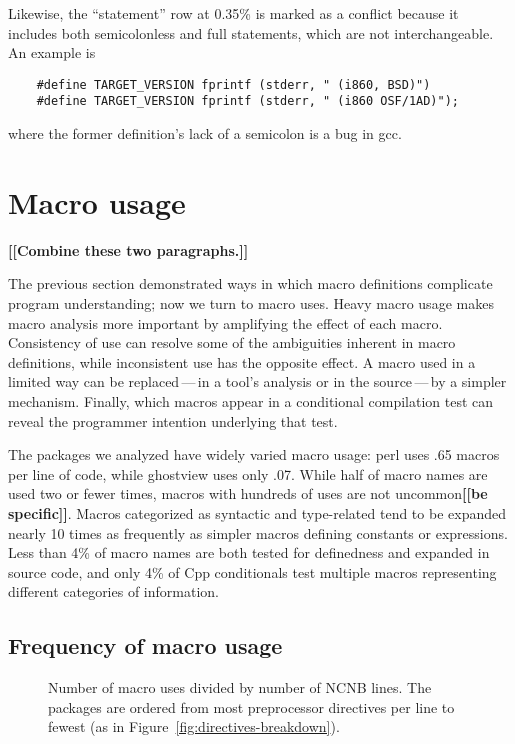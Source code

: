 \documentclass[10pt]{article}
\newcommand{\comment}[1]{\textbf{[[#1]]}}
\newcommand{\pkg}[1]{\textsf{#1}}
\newcommand{\captionsmall}[1]{\caption[]{\small #1}}
\begin{document}
Likewise, the ``statement'' row at 0.35\% is marked as a conflict because
it includes both semicolonless and full statements, which are not
interchangeable.  An example is
\begin{verbatim}
    #define TARGET_VERSION fprintf (stderr, " (i860, BSD)")
    #define TARGET_VERSION fprintf (stderr, " (i860 OSF/1AD)");
\end{verbatim}
where the former definition's lack of a semicolon is a bug in \pkg{gcc}.



\section{Macro usage}

\comment{Combine these two paragraphs.}

The previous section demonstrated ways in which macro definitions
complicate program understanding; now we turn to macro uses.  Heavy macro
usage makes macro analysis more important by amplifying the effect of each
macro.  Consistency of use can resolve some of the ambiguities
inherent in macro definitions, while inconsistent use has the opposite
effect.  A macro used in a limited way can be replaced\,---\,in a tool's
analysis or in the source\,---\,by a simpler mechanism.  Finally, which
macros appear in a conditional compilation test can reveal the programmer
intention underlying that test.

The packages we analyzed have widely varied macro usage: \pkg{perl} uses
.65 macros per line of code, while \pkg{ghostview} uses only .07.  While
half of macro names are used two or fewer times, macros with hundreds of
uses are not uncommon\comment{be specific}.  Macros categorized as syntactic and type-related
tend to be expanded nearly 10 times as frequently as simpler macros
defining constants or expressions.  Less than 4\% of macro names are both
tested for definedness and expanded in source code, and only 4\% of Cpp
conditionals test multiple macros representing different categories of
information.


\subsection{Frequency of macro usage}
\label{sec:macro-usage}

\begin{figure}
\centerline{}
\captionsmall{Number of macro uses divided by number of NCNB lines.
  The packages are ordered from most preprocessor directives per line to
  fewest (as in Figure~\ref{fig:directives-breakdown}).}
\label{fig:use-per-line}
\end{figure}
\end{document}
